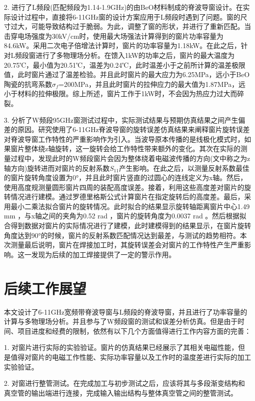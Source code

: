 \documentclass[master]{thesis-uestc}
\begin{document}
2. 进行了L频段(匹配频段为1.14-1.9GHz)的由BeO材料制成的脊波导窗设计。在实际设计过程中，直接将6-11GHz窗的设计方案应用于L频段时遇到了问题。窗的尺寸过大，可能导致结构过于脆弱。为此，调整了窗的形状，并进行了重新匹配。当击穿电场强度为30kV/cm时，使用最大场强法计算得到的窗片功率容量为84.6kW。采用二次电子倍增法计算时，窗片的功率容量为1.18kW。在此之后，针对L频段窗进行了多物理场分析。在馈入1kW的功率之后，窗片的最大温度为20.75℃，最小值为20.51℃，温差为0.24℃，此时温差小于之前所计算的温差极限值，此时窗片通过了温差检验。并且此时窗片的最大应力为6.25MPa，远小于BeO陶瓷的抗弯系数\(\sigma_f\)=200MPa，并且此时窗片的拉伸应力的最大值为1.87MPa，远小于材料的拉伸极限。综上所述，窗片工作于1kW时，不会因为热应力过大而碎裂。

3. 分析了W频段95GHz窗测试过程中，实际测试结果与预期仿真结果之间产生偏差的原因。研究使用了6-11GHz脊波导窗的旋转误差仿真结果来阐释窗片旋转误差对脊波导窗工作特性的严重影响作为引入。当波导原本传播的是线极化模式时，如果窗片整体绕z轴旋转，这一旋转会给工作特性带来额外的变化。其次在实际的测量过程中，发现此时的W频段窗片会因为整体绕着电磁波传播的方向(文中称之为z轴方向)旋转进而对窗片的反射系数\(S_{11}\)产生影响。在此之后，以测量反射系数最佳的窗片旋转角度设置为0°，并且此时窗片竖直的过圆心的连线定义为x轴。然后，使用高度规测量圆形窗片四周的装配高度误差。接着，利用这些高度差对窗片的旋转情况进行建模。通过罗德里格斯公式计算窗片在指定旋转后的高度差。最后，采用最小二乘法拟合窗片的旋转情况。此时拟合的结果显示旋转轴距离窗片中心1.49 mm ，与x轴之间的夹角为0.52 rad ，窗片的旋转角度为0.0037 rad 。然后根据拟合得到数据对窗片的实际情况进行了建模，此时建模得到的结果显示，在窗片旋转角度达到90°的时候，窗片的反射系数匹配情况达到最差，与测试的趋势相符。本次测量最后说明，窗片在焊接加工时，其旋转误差会对窗片的工作特性产生严重影响。这一发现为后续的加工焊接提供了一定的警示作用。

\section{后续工作展望}
本文设计了6-11GHz宽频带脊波导窗与L频段的脊波导窗，并且进行了功率容量的计算与多物理场分析。并且参与了W频段窗的测试和误差分析仿真。但是由于时间、项目进度和经费的限制，依然有以下几个方面值得进行工作内容方面的完善：

1. 对窗片进行实际的实验验证。窗片的仿真结果已经展示了其相关电磁性能，但是值得对窗片的电磁工作性能、实际功率容量以及工作时的温度差进行实际的加工实验验证。

2. 对窗进行整管测试。在完成加工与初步测试之后，应该将其与多段渐变结构和真空管的输出端进行连接，完成输入输出结构与整体真空管之间的整管测试。
\end{document}
